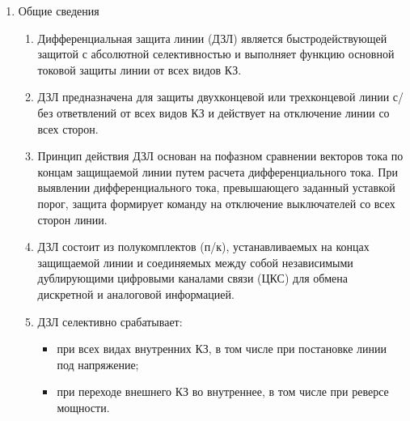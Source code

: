 \color{black}

\begin{enumerate}[label=\arabic{section}.\arabic{subsection}.\arabic{enumi}, labelsep=4pt, leftmargin=0pt, itemindent=57pt, itemsep=0pt, parsep=5pt] %

\item Общие сведения

\begin{enumerate}[label=\arabic{section}.\arabic{subsection}.\arabic{enumi}.\arabic*, labelsep=4pt, leftmargin=0em, itemindent=65pt, parsep=0pt]

\item
Дифференциальная защита линии (ДЗЛ) является быстродействующей защитой с абсолютной селективностью и выполняет функцию основной токовой защиты линии от всех видов КЗ.

\item
ДЗЛ предназначена для защиты двухконцевой или трехконцевой линии с/без ответвлений от всех видов КЗ и действует на отключение линии со всех сторон.

\item
Принцип действия ДЗЛ основан на пофазном сравнении векторов тока по концам защищаемой линии путем расчета дифференциального тока.
При выявлении дифференциального тока, превышающего заданный уставкой порог, защита формирует команду на отключение выключателей со всех сторон линии.

\item
ДЗЛ состоит из полукомплектов (п/к), устанавливаемых на концах защищаемой линии и соединяемых между собой независимыми дублирующими цифровыми каналами связи (ЦКС) для обмена дискретной и аналоговой информацией.

\item 
ДЗЛ селективно срабатывает:
\begin{itemize}
    \item при всех видах внутренних КЗ, в том числе при постановке линии под напряжение; 
    \item при переходе внешнего КЗ во внутреннее, в том числе при реверсе мощности.
\end{itemize}


\end{enumerate}
\end{enumerate}
